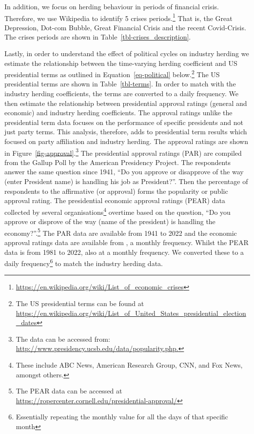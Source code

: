 \documentclass[
  letterpaper,
  DIV=11,
  numbers=noendperiod]{scrartcl}
\begin{document}
In addition, we focus on herding behaviour in periods of financial
crisis. Therefore, we use Wikipedia to identify 5 crises
periods.\footnote{\url{https://en.wikipedia.org/wiki/List_of_economic_crises}}
That is, the Great Depression, Dot-com Bubble, Great Financial Crisis
and the recent Covid-Crisis. The crises periods are shown in
Table~\ref{tbl-crises_description}.

Lastly, in order to understand the effect of political cycles on
industry herding we estimate the relationship between the time-varying
herding coefficient and US presidential terms as outlined in
Equation~\ref{eq-political} below.\footnote{The US presidential terms
  can be found at
  \url{https://en.wikipedia.org/wiki/List_of_United_States_presidential_election_dates}}
The US presidential terms are shown in Table~\ref{tbl-terms}. In order
to match with the industry herding coefficients, the terms are converted
to a daily frequency. We then estimate the relationship between
presidential approval ratings (general and economic) and industry
herding coefficients. The approval ratings unlike the presidential term
data focuses on the performance of specific presidents and not just
party terms. This analysis, therefore, adds to presidential term results
which focused on party affiliation and industry herding. The approval
ratings are shown in Figure~\ref{fig-approval}.\footnote{The data can be
  accessed from:
  \url{http://www.presidency.ucsb.edu/data/popularity.php.}} The
presidential approval ratings (PAR) are compiled from the Gallup Poll by
the American Presidency Project. The respondents answer the same
question since 1941, ``Do you approve or disapprove of the way (enter
President name) is handling his job as President?''. Then the percentage
of respondents to the affirmative (or approval) forms the popularity or
public approval rating. The presidential economic approval ratings
(PEAR) data collected by several organisations\footnote{These include
  ABC News, American Research Group, CNN, and Fox News, amongst others.}
overtime based on the question, ``Do you approve or disprove of the way
(name of the president) is handling the economy?''.\footnote{The PEAR
  data can be accessed at
  \url{https://ropercenter.cornell.edu/presidential-approval/}} The PAR
data are available from 1941 to 2022 and the economic approval ratings
data are available from , a monthly frequency. Whilst the PEAR data is
from 1981 to 2022, also at a monthly frequency. We converted these to a
daily frequency\footnote{Essentially repeating the monthly value for all
  the days of that specific month} to match the industry herding data.
\end{document}
